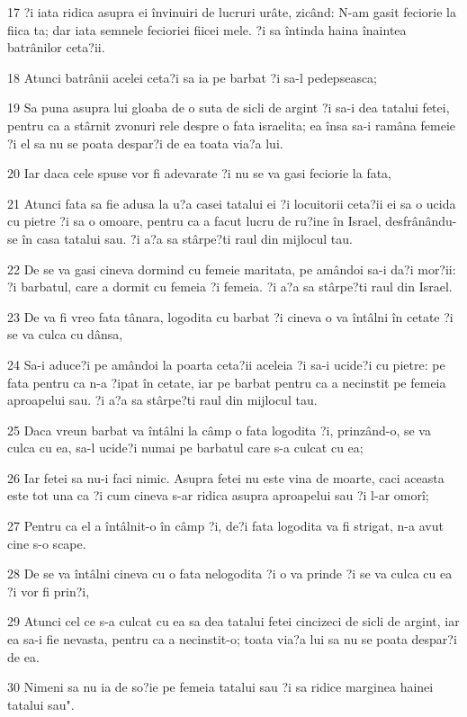 \par 17 ?i iata ridica asupra ei învinuiri de lucruri urâte, zicând: N-am gasit feciorie la fiica ta; dar iata semnele fecioriei fiicei mele. ?i sa întinda haina înaintea batrânilor ceta?ii.
\par 18 Atunci batrânii acelei ceta?i sa ia pe barbat ?i sa-l pedepseasca;
\par 19 Sa puna asupra lui gloaba de o suta de sicli de argint ?i sa-i dea tatalui fetei, pentru ca a stârnit zvonuri rele despre o fata israelita; ea însa sa-i ramâna femeie ?i el sa nu se poata despar?i de ea toata via?a lui.
\par 20 Iar daca cele spuse vor fi adevarate ?i nu se va gasi feciorie la fata,
\par 21 Atunci fata sa fie adusa la u?a casei tatalui ei ?i locuitorii ceta?ii ei sa o ucida cu pietre ?i sa o omoare, pentru ca a facut lucru de ru?ine în Israel, desfrânându-se în casa tatalui sau. ?i a?a sa stârpe?ti raul din mijlocul tau.
\par 22 De se va gasi cineva dormind cu femeie maritata, pe amândoi sa-i da?i mor?ii: ?i barbatul, care a dormit cu femeia ?i femeia. ?i a?a sa stârpe?ti raul din Israel.
\par 23 De va fi vreo fata tânara, logodita cu barbat ?i cineva o va întâlni în cetate ?i se va culca cu dânsa,
\par 24 Sa-i aduce?i pe amândoi la poarta ceta?ii aceleia ?i sa-i ucide?i cu pietre: pe fata pentru ca n-a ?ipat în cetate, iar pe barbat pentru ca a necinstit pe femeia aproapelui sau. ?i a?a sa stârpe?ti raul din mijlocul tau.
\par 25 Daca vreun barbat va întâlni la câmp o fata logodita ?i, prinzând-o, se va culca cu ea, sa-l ucide?i numai pe barbatul care s-a culcat cu ea;
\par 26 Iar fetei sa nu-i faci nimic. Asupra fetei nu este vina de moarte, caci aceasta este tot una ca ?i cum cineva s-ar ridica asupra aproapelui sau ?i l-ar omorî;
\par 27 Pentru ca el a întâlnit-o în câmp ?i, de?i fata logodita va fi strigat, n-a avut cine s-o scape.
\par 28 De se va întâlni cineva cu o fata nelogodita ?i o va prinde ?i se va culca cu ea ?i vor fi prin?i,
\par 29 Atunci cel ce s-a culcat cu ea sa dea tatalui fetei cincizeci de sicli de argint, iar ea sa-i fie nevasta, pentru ca a necinstit-o; toata via?a lui sa nu se poata despar?i de ea.
\par 30 Nimeni sa nu ia de so?ie pe femeia tatalui sau ?i sa ridice marginea hainei tatalui sau".

